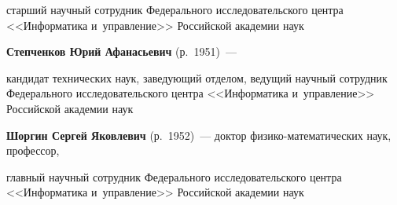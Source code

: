 старший научный сотрудник Федерального исследовательского цент\-ра <<Информатика и~управ\-ле\-ние>> Российской академии наук





\noindent


\textbf{Степченков Юрий Афанасьевич} (р.\ 1951)~--- 


кандидат технических наук, заведующий отделом, ведущий научный сотрудник Федерального исследовательского цент\-ра <<Информатика и~управ\-ле\-ние>> Российской академии наук











\noindent


\textbf{Шоргин Сергей Яковлевич} (р.\ 1952)~--- доктор фи\-зи\-ко-ма\-те\-ма\-ти\-че\-ских наук, профессор, 


главный научный сотрудник Федерального исследовательского цент\-ра <<Информатика и~управ\-ле\-ние>> Российской академии наук































\def\rightkol{Об авторах}


\def\leftkol{Об авторах}
























 \label{end\stat}








%



